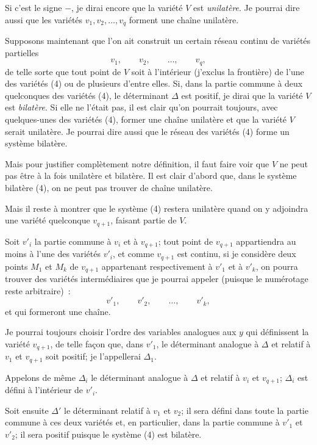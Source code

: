 \documentclass{article}
\begin{document}
Si c'est le signe $-$, je dirai encore que la variété $V$ est \emph{unilatère}. Je pourrai dire aussi que les variétés $v_{1}, v_{2}, \ldots, v_{q}$ forment une chaîne unilatère.

Supposons maintenant que l'on ait construit un certain réseau continu de variétés partielles
\[
v_{1}, \qquad v_{2}, \qquad \ldots, \qquad v_{q}, \tag{4}
\]
de telle sorte que tout point de $V$ soit à l'intérieur (j'exclus la frontière) de l'une des variétés (4) ou de plusieurs d'entre elles. Si, dans la partie commune à deux quelconques des variétés (4), le déterminant $\Delta$ est positif, je dirai que la variété $V$ est \emph{bilatère}. Si elle ne l'était pas, il est clair
qu'on pourrait toujours, avec quelques-unes des variétés (4), former une chaîne unilatère et que la variété $V$ serait unilatère. Je pourrai dire aussi que le réseau des variétés (4) forme un système bilatère.

Mais pour justifier complètement notre définition, il faut faire voir que $V$ ne peut pas être à la fois unilatère et bilatère. Il est clair d'abord que, dans le système bilatère (4), on ne peut pas trouver de chaîne unilatère.

Mais il reste à montrer que le système (4) restera unilatère quand on y adjoindra une variété quelconque $v_{q+1}$, faisant partie de $V$.

Soit $v'_{i}$ la partie commune à $v_{i}$ et à $v_{q+1}$; tout point de $v_{q+1}$ appartiendra au moins à l'une des variétés $v'_{i}$, et comme $v_{q+1}$ est continu, si je considère deux points $M_{1}$ et $M_{k}$ de $v_{q+1}$ appartenant respectivement à $v'_{1}$ et à $v'_{k}$, on pourra trouver des variétés intermédiaires que je pourrai appeler (puisque le numérotage reste arbitraire)~:
\[
v'_{1}, \qquad v'_{2}, \qquad \ldots, \qquad v'_{k},
\]
et qui formeront une chaîne.

Je pourrai toujours choisir l'ordre des variables analogues aux $y$ qui définissent la variété $v_{q+1}$, de telle façon que, dans $v'_{1}$, le déterminant analogue à $\Delta$ et relatif à $v_{1}$ et $v_{q+1}$ soit positif; je l'appellerai $\Delta_{1}$.

Appelons de même $\Delta_{i}$ le déterminant analogue à $\Delta$ et relatif à $v_{i}$ et $v_{q+1}$; $\Delta_{i}$ est défini à l'intérieur de $v'_{i}$.

Soit ensuite $\Delta'$ le déterminant relatif à $v_{1}$ et $v_{2}$; il sera défini dans toute la partie commune à ces deux variétés et, en particulier, dans la partie commune à $v'_{1}$ et $v'_{2}$; il sera positif puisque le système (4) est bilatère.
\end{document}
